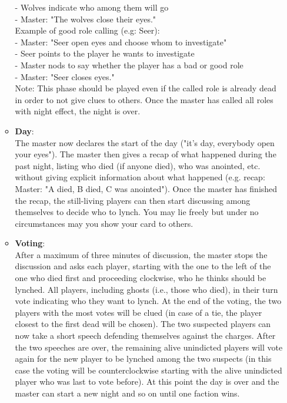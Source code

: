 \begin{itemize}
\begin{itemize}
        - Wolves indicate who among them will go\\
        - Master: "The wolves close their eyes."\\
        Example of good role calling (e.g: Seer):\\
        - Master: "Seer open eyes and choose whom to investigate"\\
        - Seer points to the player he wants to investigate\\
        - Master nods to say whether the player has a bad or good role\\
        - Master: "Seer closes eyes."\\
        Note: This phase should be played even if the called role is already dead in order to not give clues to others. Once the master has called all roles with night effect, the night is over.
        \item \textbf{Day}: \\The master now declares the start of the day ("it's day, everybody open your eyes"). The master then gives a recap of what happened during the past night, listing who died (if anyone died), who was anointed, etc. without giving explicit information about what happened (e.g. recap: Master: "A died, B died, C was anointed"). Once the master has finished the recap, the still-living players can then start discussing among themselves to decide who to lynch. You may lie freely but under no circumstances may you show your card to others.
        \item \textbf{Voting}: \\After a maximum of three minutes of discussion, the master stops the discussion and asks each player, starting with the one to the left of the one who died first and proceeding clockwise, who he thinks should be lynched. All players, including ghosts (i.e., those who died), in their turn vote indicating who they want to lynch. At the end of the voting, the two players with the most votes will be clued (in case of a tie, the player closest to the first dead will be chosen). The two suspected players can now take a short speech defending themselves against the charges. After the two speeches are over, the remaining alive unindicted players will vote again for the new player to be lynched among the two suspects (in this case the voting will be counterclockwise starting with the alive unindicted player who was last to vote before). At this point the day is over and the master can start a new night and so on until one faction wins.\\

\end{itemize}
\end{itemize}
